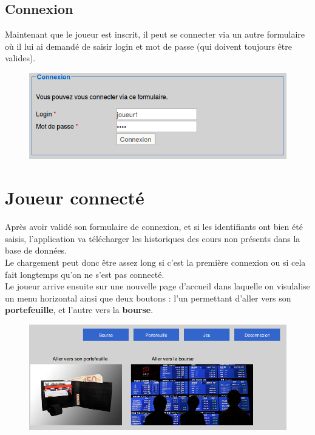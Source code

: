     \subsection{Connexion}
    Maintenant que le joueur est inscrit, il peut se connecter via un autre formulaire où il lui ai demandé de saisir login et mot de passe (qui doivent toujours être valides). 
    \begin{figure}[H]
      \center
      \includegraphics[scale=0.5]{../graph/3-connexion.png}
    \end{figure}

  \section{Joueur connecté}  
  Après avoir validé son formulaire de connexion, et si les identifiants ont bien été saisis, l'application va télécharger les historiques des cours non présents dans la base de données.\\
  
  \noindent Le chargement peut donc être assez long si c'est la première connexion ou si cela fait longtemps qu'on ne s'est pas connecté.\\
  
  \noindent Le joueur arrive ensuite sur une nouvelle page d'accueil dans laquelle on visulalise un menu horizontal ainsi que deux boutons : l'un permettant d'aller vers son \textbf{portefeuille}, et l'autre vers la \textbf{bourse}.
  \begin{figure}[H]
    \center
    \includegraphics[scale=0.5]{../graph/4-accueilconnecte.png}
  \end{figure}
    
